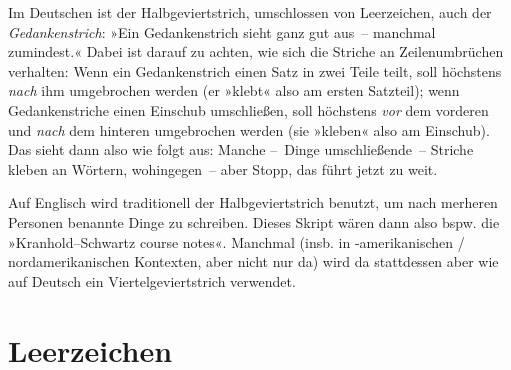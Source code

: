 Im Deutschen ist der Halbgeviertstrich, umschlossen von Leerzeichen,
auch der \emph{Gedankenstrich}: »Ein Gedankenstrich sieht ganz gut
aus~-- manchmal zumindest.«  Dabei ist darauf zu achten, wie sich die
Striche an Zeilenumbrüchen verhalten: Wenn ein Gedankenstrich einen
Satz in zwei Teile teilt, soll höchstens \emph{nach} ihm umgebrochen
werden (er »klebt« also am ersten Satzteil); wenn Gedankenstriche
einen Einschub umschließen, soll höchstens \emph{vor} dem vorderen und
\emph{nach} dem hinteren umgebrochen werden (sie »kleben« also am
Einschub).  Das sieht dann also wie folgt aus:  Manche --~Dinge
umschließende~-- Striche kleben an Wörtern, wohingegen~--
aber Stopp, das führt jetzt zu weit.

Auf Englisch wird traditionell der Halbgeviertstrich benutzt, um nach
merheren Personen benannte Dinge zu schreiben.  Dieses Skript wären
dann also bspw. die »\foreignlanguage{british}{Kranhold--Schwartz
  course notes}«.  Manchmal (insb. in -amerikanischen /
nordamerikanischen Kontexten, aber nicht nur da) wird da stattdessen
aber wie auf Deutsch ein Viertelgeviertstrich verwendet.

\section{Leerzeichen}

